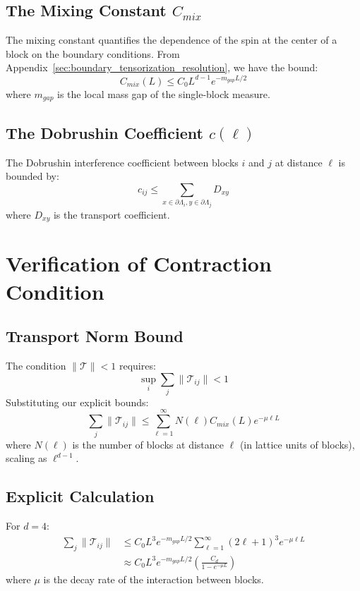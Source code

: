 \subsection{The Mixing Constant \texorpdfstring{$C_{mix}$}{C\_mix}}
The mixing constant quantifies the dependence of the spin at the center of a block on the boundary conditions.
From Appendix~\ref{sec:boundary_tensorization_resolution}, we have the bound:
\begin{equation}
C_{mix}(L) \le C_0 L^{d-1} e^{-m_{gap} L / 2}
\end{equation}
where $m_{gap}$ is the local mass gap of the single-block measure.

\subsection{The Dobrushin Coefficient \texorpdfstring{$c(\ell)$}{c(l)}}
The Dobrushin interference coefficient between blocks $i$ and $j$ at distance $\ell$ is bounded by:
\begin{equation}
c_{ij} \le \sum_{x \in \partial \Lambda_i, y \in \partial \Lambda_j} D_{xy}
\end{equation}
where $D_{xy}$ is the transport coefficient.

\section{Verification of Contraction Condition}

\subsection{Transport Norm Bound}
The condition $\|\mathcal{T}\| < 1$ requires:
\begin{equation}
\sup_i \sum_j \|\mathcal{T}_{ij}\| < 1
\end{equation}
Substituting our explicit bounds:
\begin{equation}
\sum_j \|\mathcal{T}_{ij}\| \le \sum_{\ell=1}^\infty N(\ell) C_{mix}(L) e^{-\mu \ell L}
\end{equation}
where $N(\ell)$ is the number of blocks at distance $\ell$ (in lattice units of blocks), scaling as $\ell^{d-1}$.

\subsection{Explicit Calculation}
For $d=4$:
\begin{align}
\sum_j \|\mathcal{T}_{ij}\| &\le C_0 L^3 e^{-m_{gap}L/2} \sum_{\ell=1}^\infty (2\ell+1)^3 e^{-\mu \ell L} \\
&\approx C_0 L^3 e^{-m_{gap}L/2} \left( \frac{C_d}{1 - e^{-\mu L}} \right)
\end{align}
where $\mu$ is the decay rate of the interaction between blocks.

